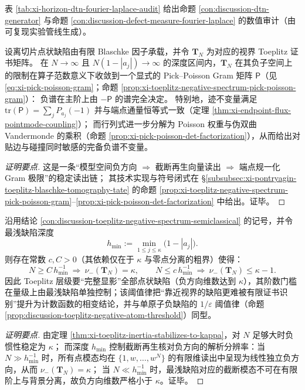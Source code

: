 表 \ref{tab:xi-horizon-dtn-fourier-laplace-audit} 给出命题 \ref{con:discussion-dtn-generator} 与命题 \ref{con:discussion-defect-measure-fourier-laplace} 的数值审计（由可复现实验管线生成）。


\begin{proposition}\label{con:discussion-toeplitz-negative-spectrum-semiclassical}
设离切片点状缺陷由有限 Blaschke 因子承载，并令 \(\mathbf{T}_N\) 为对应的视界 Toeplitz 证书矩阵。
在 \(N\to\infty\) 且 \(N(1-|a_j|)\to\infty\) 的深度区间内，\(\mathbf{T}_N\) 在其负子空间上的限制在算子范数意义下收敛到一个显式的 Pick--Poisson Gram 矩阵 \(\mathsf P\)（见 \eqref{eq:xi-pick-poisson-gram}；命题 \ref{prop:xi-toeplitz-negative-spectrum-pick-poisson-gram}）：
负谱在主阶上由 \(-\mathsf P\) 的谱完全决定。
特别地，迹不变量满足
\(
\mathrm{tr}(\mathsf P)=\sum_j P_{a_j}(-1)
\)
并与端点通量恒等式一致（定理 \ref{thm:xi-endpoint-flux-pointmode-coupling}）；
而行列式进一步分解为 Poisson 权重与伪双曲 Vandermonde 的乘积（命题 \ref{prop:xi-pick-poisson-det-factorization}），从而给出对贴边与碰撞同时敏感的完备负谱不变量。
\end{proposition}
\begin{proof}[证明要点]
这是一条“模型空间负方向 \(\Rightarrow\) 截断再生向量读出 \(\Rightarrow\) 端点规一化 Gram 极限”的稳定读出链；
其技术实现与符号闭式在 \S\ref{subsubsec:xi-pontryagin-toeplitz-blaschke-tomography-tate} 的命题 \ref{prop:xi-toeplitz-negative-spectrum-pick-poisson-gram}--\ref{prop:xi-pick-poisson-det-factorization} 中给出。证毕。
\end{proof}

\begin{proposition}\label{con:discussion-toeplitz-negative-count-threshold}
沿用结论 \ref{con:discussion-toeplitz-negative-spectrum-semiclassical} 的记号，并令最浅缺陷深度
\[
h_{\min}:=\min_{1\le j\le \kappa}\bigl(1-|a_j|\bigr).
\]
则存在常数 \(c,C>0\)（其依赖仅在于 \(\kappa\) 与零点分离的粗界）使得：
\[
\boxed{\;
N\ge C\,h_{\min}^{-1}\ \Longrightarrow\ \nu_-(\mathbf{T}_N)=\kappa,\qquad
N\le c\,h_{\min}^{-1}\ \Longrightarrow\ \nu_-(\mathbf{T}_N)\le \kappa-1.\;}
\]
因此 Toeplitz 层级要“完整显影”全部点状缺陷（负方向维数达到 \(\kappa\)），其阶数门槛在量级上由最浅缺陷单独控制；该阈值律把“靠近视界的缺陷更难被有限证书识别”提升为计数函数的相变结论，并与单原子负缺陷的 \(1/\varepsilon\) 阈值律（命题 \ref{prop:discussion-toeplitz-negative-atom-threshold}）同型。
\end{proposition}
\begin{proof}[证明要点]
由定理 \ref{thm:xi-toeplitz-inertia-stabilizes-to-kappa}，对 \(N\) 足够大时负惯性稳定为 \(\kappa\)；
而深度 \(h_{\min}\) 控制截断再生核对负方向的解析分辨率：当 \(N\gg h_{\min}^{-1}\) 时，所有点模态均在 \(\{1,w,\dots,w^N\}\) 的有限维读出中呈现为线性独立负方向，从而 \(\nu_-(\mathbf{T}_N)=\kappa\)；
当 \(N\ll h_{\min}^{-1}\) 时，最浅缺陷对应的截断模态不可在有限阶上与背景分离，故负方向维数严格小于 \(\kappa\)。证毕。
\end{proof}

